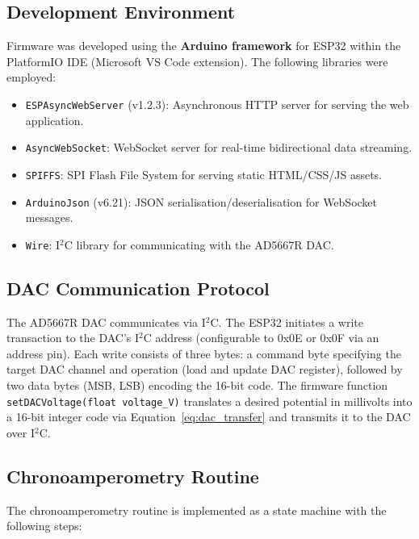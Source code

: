 \subsection{Development Environment}

Firmware was developed using the \textbf{Arduino framework} for ESP32 within the PlatformIO IDE (Microsoft VS Code extension). The following libraries were employed:

\begin{itemize}
    \item \texttt{ESPAsyncWebServer} (v1.2.3): Asynchronous HTTP server for serving the web application.
    \item \texttt{AsyncWebSocket}: WebSocket server for real-time bidirectional data streaming.
    \item \texttt{SPIFFS}: SPI Flash File System for serving static HTML/CSS/JS assets.
    \item \texttt{ArduinoJson} (v6.21): JSON serialisation/deserialisation for WebSocket messages.
    \item \texttt{Wire}: I$^2$C library for communicating with the AD5667R DAC.
\end{itemize}

\subsection{DAC Communication Protocol}

The AD5667R DAC communicates via I$^2$C. The ESP32 initiates a write transaction to the DAC's I$^2$C address (configurable to 0x0E or 0x0F via an address pin). Each write consists of three bytes: a command byte specifying the target DAC channel and operation (load and update DAC register), followed by two data bytes (MSB, LSB) encoding the 16-bit code. The firmware function \texttt{setDACVoltage(float voltage\_V)} translates a desired potential in millivolts into a 16-bit integer code via Equation~\ref{eq:dac_transfer} and transmits it to the DAC over I$^2$C.

\subsection{Chronoamperometry Routine}

The chronoamperometry routine is implemented as a state machine with the following steps:

